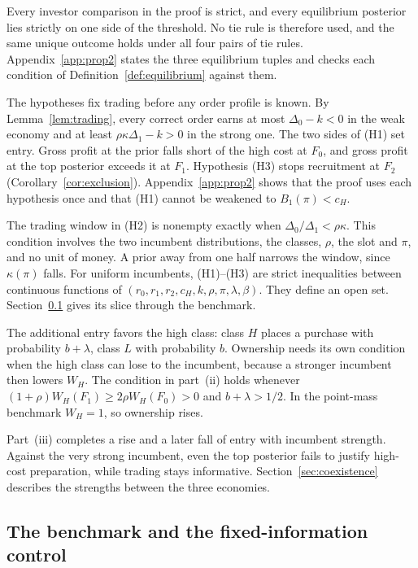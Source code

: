 Every investor comparison in the proof is strict, and every equilibrium posterior lies strictly on one side of the
threshold. No tie rule is therefore used, and the same unique outcome holds under all four pairs of tie rules.
Appendix~\ref{app:prop2} states the three equilibrium tuples and checks each condition of
Definition~\ref{def:equilibrium} against them.

The hypotheses fix trading before any order profile is known. By Lemma~\ref{lem:trading}, every correct order
earns at most \(\Delta_0-k<0\) in the weak economy and at least \(\rho\kappa\Delta_1-k>0\) in the strong one. The two
sides of (H1) set entry. Gross profit at the prior falls short of the high cost at \(F_0\), and gross profit at the
top posterior exceeds it at \(F_1\). Hypothesis (H3) stops recruitment at \(F_2\) (Corollary~\ref{cor:exclusion}).
Appendix~\ref{app:prop2} shows that the proof uses each hypothesis once and that (H1) cannot be weakened to
\(B_1(\pi)<c_H\).

The trading window in (H2) is nonempty exactly when \(\Delta_0/\Delta_1<\rho\kappa\). This condition involves the
two incumbent distributions, the classes, \(\rho\), the slot and \(\pi\), and no unit of money. A prior away from
one half narrows the window, since \(\kappa(\pi)\) falls. For uniform incumbents, (H1)--(H3) are strict
inequalities between continuous functions of \((r_0,r_1,r_2,c_H,k,\rho,\pi,\lambda,\beta)\). They define an open
set. Section~\ref{sec:benchmark} gives its slice through the benchmark.

The additional entry favors the high class: class \(H\) places a purchase with probability \(b+\lambda\), class
\(L\) with probability \(b\). Ownership needs its own condition when the high class can lose to the incumbent,
because a stronger incumbent then lowers \(W_H\). The condition in part~(ii) holds whenever
\((1+\rho)W_H(F_1)\ge2\rho W_H(F_0)>0\) and \(b+\lambda>1/2\). In the point-mass benchmark \(W_H=1\), so ownership
rises.

Part~(iii) completes a rise and a later fall of entry with incumbent strength. Against the very strong incumbent,
even the top posterior fails to justify high-cost preparation, while trading stays informative.
Section~\ref{sec:coexistence} describes the strengths between the three economies.

\subsection{The benchmark and the fixed-information control}\label{sec:benchmark}

